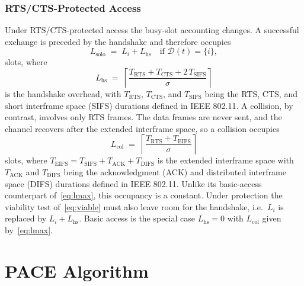 \documentclass[journal,10pt]{IEEEtran}
\begin{document}
\subsubsection{RTS/CTS-Protected Access}
Under RTS/CTS-protected access the busy-slot accounting changes. A successful exchange is preceded by the handshake and therefore occupies
\begin{equation}
    L_\mathrm{solo} \;=\; L_i + L_\mathrm{hs} \quad \text{if } \mathcal{D}(t)=\{i\},
    \label{eq:lsolo_rts}
\end{equation}
slots, where
\begin{equation}
    L_\mathrm{hs} \;=\; \left\lceil
    \frac{T_\mathrm{RTS} + T_\mathrm{CTS} + 2\,T_\mathrm{SIFS}}{\sigma}
    \right\rceil
    \label{eq:oh_rts}
\end{equation}
is the handshake overhead, with $T_\mathrm{RTS}$, $T_\mathrm{CTS}$, and $T_\mathrm{SIFS}$ being the RTS, CTS, and short interframe space (SIFS) durations defined in IEEE 802.11. A collision, by contrast, involves only RTS frames. The data frames are never sent, and the channel recovers after the extended interframe space, so a collision occupies
\begin{equation}
    L_\mathrm{col} \;=\; \left\lceil
    \frac{T_\mathrm{RTS} + T_\mathrm{EIFS}}{\sigma} \right\rceil
    \label{eq:coll_rts}
\end{equation}
slots, where $T_\mathrm{EIFS}=T_\mathrm{SIFS}+T_\mathrm{ACK}+T_\mathrm{DIFS}$ is the extended interframe space with $T_\mathrm{ACK}$ and $T_\mathrm{DIFS}$ being the acknowledgment (ACK) and distributed interframe space (DIFS) durations defined in IEEE 802.11. Unlike its basic-access counterpart of~\eqref{eq:lmax}, this occupancy is a constant. Under protection the viability test of~\eqref{eq:viable} must also leave room for the handshake, i.e.\ $L_i$ is replaced by $L_i+L_\mathrm{hs}$. Basic access is the special case $L_\mathrm{hs}=0$ with $L_\mathrm{col}$ given by~\eqref{eq:lmax}.

\section{PACE Algorithm}
\label{sec:pace_algorithm}
\end{document}
